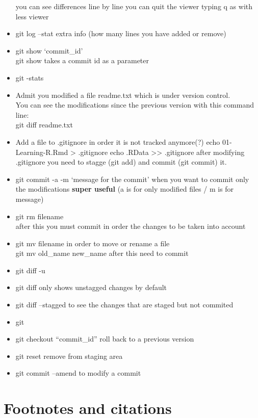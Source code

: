 \documentclass[
]{book}
\begin{document}
\begin{itemize}
  you can see differences line by line
  you can quit the viewer typing q as with less viewer
\item
  git log --stat
  extra info (how many lines you have added or remove)
\item
  git show `commit\_id'\\
  git show takes a commit id as a parameter
\item
  git -stats
\item
  Admit you modified a file readme.txt which is under version control.\\
  You can see the modifications since the previous version with this command line:\\
  git diff readme.txt
\item
  Add a file to .gitignore in order it is not tracked anymore(?)
  echo 01-Learning-R.Rmd \textgreater{} .gitignore
  echo .RData \textgreater\textgreater{} .gitignore
  after modifying .gitignore you need to stagge (git add) and commit (git commit) it.
\item
  git commit -a -m `message for the commit'
  when you want to commit only the modifications \textbf{super useful}
  (a is for only modified files / m is for message)
\item
  git rm filename\\
  after this you must commit in order the changes to be taken into account
\item
  git mv filename in order to move or rename a file\\
  git mv old\_name new\_name
  after this need to commit
\item
  git diff -u
\item
  git diff only shows unstagged changes by default
\item
  git diff --stagged to see the changes that are staged but not commited
\item
  git
\item
  git checkout ``commit\_id''
  roll back to a previous version
\item
  git reset
  remove from staging area
\item
  git commit --amend
  to modify a commit
\end{itemize}

\hypertarget{footnotes-and-citations}{%
\chapter{Footnotes and citations}\label{footnotes-and-citations}}
\end{document}
